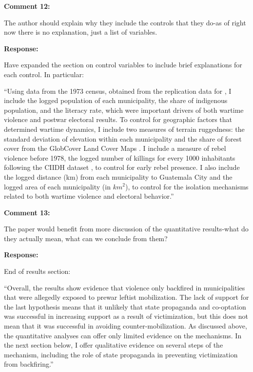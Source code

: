 \documentclass[12pt, a4paper, notitlepage]{article}
\begin{document}
\vspace{15pt}
\noindent\textbf{Comment 12:}
\begin{displayquote}
The author should explain why they include the controls that they do-as of right now there is no explanation, just a list of variables.
\end{displayquote}

\noindent\textbf{Response:}

Have expanded the section on control variables to include brief explanations for each control. In particular:

``Using data from the 1973 census, obtained from the replication data for \citet{Sullivan:2012aa}, I include the logged population of each municipality, the share of indigenous population, and the literacy rate, which were important drivers of both wartime violence and postwar electoral results.
To control for geographic factors that determined wartime dynamics, I include two measures of terrain ruggedness: the standard deviation of elevation within each municipality \citep{Mapzen:2018aa} and the share of forest cover from the GlobCover Land Cover Maps \citep{Arino:2012aa}.
I include a measure of rebel violence before 1978, the logged number of killings for every 1000 inhabitants following the CIIDH dataset \citep{Ball:1999aa}, to control for early rebel presence.
I also include the logged distance (km) from each municipality to Guatemala City and the logged area of each municipality (in $km^2$), to control for the isolation mechanisms related to both wartime violence and electoral behavior.''

\vspace{15pt}
\noindent\textbf{Comment 13:}
\begin{displayquote}
The paper would benefit from more discussion of the quantitative results-what do they actually mean, what can we conclude from them?
\end{displayquote}

\noindent\textbf{Response:}

End of results section:

``Overall, the results show evidence that violence only backfired in municipalities that were allegedly exposed to prewar leftist mobilization.
The lack of support for the last hypothesis means that it unlikely that state propaganda and co-optation was successful in increasing support as a result of victimization, but this does not mean that it was successful in avoiding counter-mobilization.
As discussed above, the quantitative analyses can offer only limited evidence on the mechanisms.
In the next section below, I offer qualitative evidence on several steps of the mechanism, including the role of state propaganda in preventing victimization from backfiring.''
\end{document}
